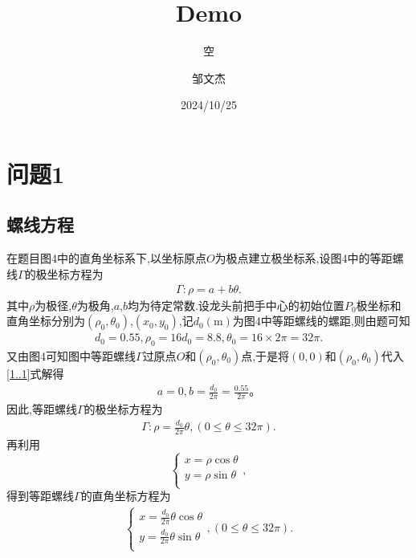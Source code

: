 \documentclass[lang=cn,newtx,10pt,scheme=chinese]{../Template/elegantbook}
\title{Demo}
\subtitle{空}
\author{邹文杰}
\institute{无}
\date{2024/10/25}
\begin{document}
\maketitle

\frontmatter

\tableofcontents

\mainmatter


\chapter{问题1}

\section{螺线方程}

在题目图4中的直角坐标系下,以坐标原点\(O\)为极点建立极坐标系,设图4中的等距螺线\(\varGamma\)的极坐标方程为
\begin{align}\label{1..1}
\varGamma :\rho =a+b\theta.
\end{align}
其中\(\rho\)为极径,\(\theta\)为极角,\(a\),\(b\)均为待定常数.设龙头前把手中心的初始位置\(P_0\)极坐标和直角坐标分别为\((\rho _0,\theta _0)\),\((x_0,y_0)\),记\(d_0(\mathrm{m})\)为图4中等距螺线的螺距,则由题可知
\begin{align}
d_0 = 0.55,\rho _0 = 16d_0 = 8.8,\theta _0 = 16\times 2\pi = 32\pi.
\end{align}
又由图4可知图中等距螺线\(\varGamma\)过原点\(O\)和\((\rho _0,\theta _0)\)点,于是将\((0,0)\)和\((\rho _0,\theta _0)\)代入\eqref{1..1}式解得
\begin{align}
    a = 0,b = \frac{d_0}{2\pi}=\frac{0.55}{2\pi}。
\end{align}
因此,等距螺线\(\varGamma\)的极坐标方程为
\begin{align}
\varGamma :\rho =\frac{d_0}{2\pi}\theta ,(0\leqslant \theta \leqslant 32\pi) .\label{0.1}
\end{align}
再利用
\[\begin{cases}
x=\rho \cos \theta\\
y=\rho \sin \theta\\
\end{cases},\]
得到等距螺线\(\varGamma\)的直角坐标方程为
\begin{align}
\begin{cases}
x=\frac{d_0}{2\pi}\theta \cos \theta\\
y=\frac{d_0}{2\pi}\theta \sin \theta\\
\end{cases},(0\leqslant \theta \leqslant 32\pi) .\label{0.0}
\end{align}
\end{document}
